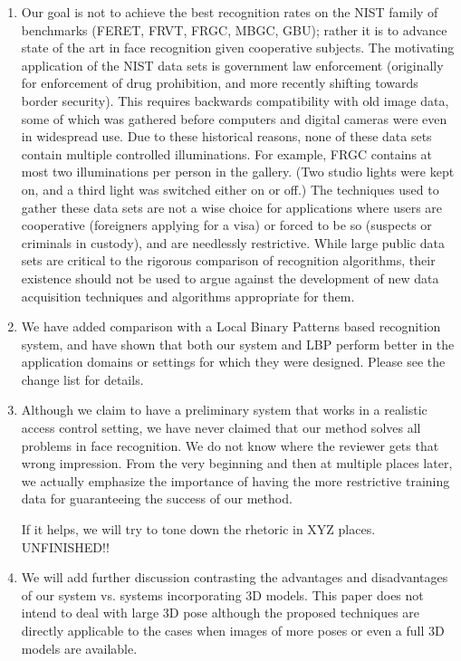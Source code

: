 \documentclass[11pt]{article}
\begin{document}
\begin{enumerate}
\item Our goal is not to achieve the best recognition rates on the NIST family
of benchmarks (FERET, FRVT, FRGC, MBGC, GBU); rather it is to advance state of
the art in face recognition given cooperative subjects.  The motivating
application of the NIST data sets is government law enforcement (originally for
enforcement of drug prohibition, and more recently shifting towards border
security).  This requires backwards compatibility with old image data, some of
which was gathered before computers and digital cameras were even in widespread
use.  Due to these historical reasons, none of these data sets contain multiple
controlled illuminations.  For example, FRGC contains at most two illuminations
per person in the gallery.  (Two studio lights were kept on, and a third light
was switched either on or off.) The techniques used to gather these data sets
are not a wise choice for applications where users are cooperative (foreigners
applying for a visa) or forced to be so (suspects or criminals in custody), and
are needlessly restrictive.  While large public data sets are critical to the
rigorous comparison of recognition algorithms, their existence should not be
used to argue against the development of new data acquisition techniques and
algorithms appropriate for them.

\item We have added comparison with a Local Binary Patterns based recognition
system, and have shown that both our system and LBP perform better in the
application domains or settings for which they were designed.  Please see the
change list for details. 

\item Although we claim to have a preliminary system that works in a realistic
access control setting, we have never claimed that our method solves all problems in face
recognition. We do not know where the reviewer gets that wrong impression. 
From the very beginning and then at multiple places later, we actually emphasize
the importance of having the more restrictive training data for guaranteeing the success 
of our method. 

If it helps, we will try to tone down the rhetoric in XYZ places. UNFINISHED!!

\item We will add further discussion contrasting the advantages and
disadvantages of our system vs. systems incorporating 3D models. This paper
does not intend to deal with large 3D pose although the proposed techniques are
directly applicable to the cases when images of more poses or even a full 3D
models are available. 


\end{enumerate}
\end{document}
